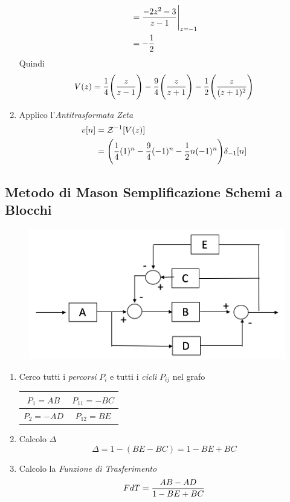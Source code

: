 \documentclass{article}
\begin{document}
\begin{enumerate}
\[\begin{aligned}
							&= {{-2z^2 - 3}\over{z - 1}}\Bigg\vert_{z=-1} \\
					  		&= -{{1}\over{2}}
					  	\end{aligned}
					  \]
					  Quindi
					  \[
					  	V(z) = {{1}\over{4}}\Bigg( {{z}\over{z - 1}} \Bigg) - {{9}\over{4}}\Bigg( {{z}\over{z + 1}} \Bigg) - {{1}\over{2}}\Bigg( {{z}\over{(z + 1)^2}} \Bigg)
					  \]
				\item Applico l'\textit{Antitrasformata Zeta}
					  \[
					  	\begin{aligned}
							v[n] &= \mathcal{Z}^{-1}[V(z)] \\
					  		&= \Bigg( {{1}\over{4}}(1)^n - {{9}\over{4}}(-1)^n - {{1}\over{2}}n(-1)^n \Bigg)\delta_{-1}[n]
					  	\end{aligned}
					  \]
			\end{enumerate}

		\subsection{Metodo di Mason Semplificazione Schemi a Blocchi}
			\begin{figure}[h!]
				\centering
				\includegraphics[scale=0.7]{./pictures/diagramma_blocchi.png}
			\end{figure}
			\begin{enumerate}
				\item Cerco tutti i \textit{percorsi} $ P_i $ e tutti i \textit{cicli} $ P_{ij} $ nel grafo
					  \begin{center}
				    	\begin{tabular}{ c c }
					  	  	\toprule
					  	  	$ P_1 = AB  $ & $ P_{11} = -BC $ \\
					  	  	\hline
					  	  	$ P_2 = -AD $ & $ P_{12} = BE $ \\
					  	  	\bottomrule
				    	\end{tabular}
				  	  \end{center}
				\item Calcolo $ \Delta $
					  \[
					  	\Delta = 1 - (BE - BC) = 1 - BE + BC
					  \]
				\item Calcolo la \textit{Funzione di Trasferimento}
					  \[
					  	FdT = {{AB - AD}\over{1 - BE + BC}}
					  \]
			\end{enumerate}
\end{document}
